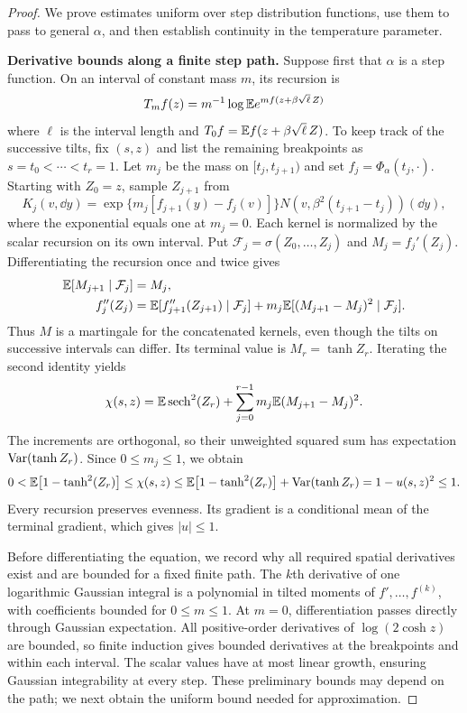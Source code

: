 \begin{proof}
We prove estimates uniform over step distribution functions, use them
to pass to general $\alpha$, and then establish continuity in the
temperature parameter.

\par\medskip\noindent\textbf{Derivative bounds along a finite step path.}\enspace
Suppose first that $\alpha$ is a step function. On an interval of
constant mass $m$, its recursion is
\[
 T_m f(z)=m^{-1}\log\mathbb E e^{m f(z+\beta\sqrt{\ell}\,Z)}
\]
where $\ell$ is the interval length and
$T_0f=\mathbb E f(z+\beta\sqrt{\ell}\,Z)$. To keep track of the successive
tilts, fix $(s,z)$ and list the remaining breakpoints as
$s=t_0<\cdots<t_r=1$. Let $m_j$ be the mass on
$[t_j,t_{j+1})$ and set $f_j=\Phi_\alpha(t_j,\cdot)$.
Starting with $Z_0=z$, sample $Z_{j+1}$ from
\[
 K_j(v,\dd y)
 =\exp\{m_j[f_{j+1}(y)-f_j(v)]\}
       N(v,\beta^2(t_{j+1}-t_j))(\dd y),
\]
where the exponential equals one at $m_j=0$. Each kernel is normalized by
the scalar recursion on its own interval. Put
$\mathcal F_j=\sigma(Z_0,\ldots,Z_j)$ and $M_j=f_j'(Z_j)$.
Differentiating the recursion once and twice gives
\begin{align*}
 \mathbb E[M_{j+1}\mid\mathcal F_j]&=M_j,\\
 f_j''(Z_j)&=\mathbb E[f_{j+1}''(Z_{j+1})\mid\mathcal F_j]
      +m_j\mathbb E[(M_{j+1}-M_j)^2\mid\mathcal F_j].
\end{align*}
Thus $M$ is a martingale for the concatenated kernels, even though
the tilts on successive intervals can differ. Its terminal value is
$M_r=\tanh Z_r$. Iterating the second identity yields
\[
 \chi(s,z)=\mathbb E\operatorname{sech}^2(Z_r)
           +\sum_{j=0}^{r-1}m_j\mathbb E(M_{j+1}-M_j)^2.
\]
The increments are orthogonal, so their unweighted squared sum has
expectation $\operatorname{Var}(\tanh Z_r)$. Since $0\le m_j\le1$, we obtain
\[
 0<\mathbb E\bigl[1-\tanh^2(Z_r)\bigr]
 \le\chi(s,z)
 \le \mathbb E\bigl[1-\tanh^2(Z_r)\bigr]
       +\operatorname{Var}(\tanh Z_r)
 =1-u(s,z)^2\le1.
\]
Every recursion preserves evenness. Its gradient is a conditional
mean of the terminal gradient, which gives $|u|\le1$.

Before differentiating the equation, we record why all required
spatial derivatives exist and are bounded for a fixed finite path.
The $k$th derivative of one logarithmic Gaussian integral is a
polynomial in tilted moments of $f',\ldots,f^{(k)}$, with coefficients
bounded for $0\le m\le1$. At $m=0$, differentiation passes directly
through Gaussian expectation. All positive-order derivatives of
$\log(2\cosh z)$ are bounded, so finite induction gives bounded
derivatives at the breakpoints and within each interval. The scalar
values have at most linear growth, ensuring Gaussian integrability
at every step. These preliminary bounds may depend on the path; we
next obtain the uniform bound needed for approximation.


\end{proof}
